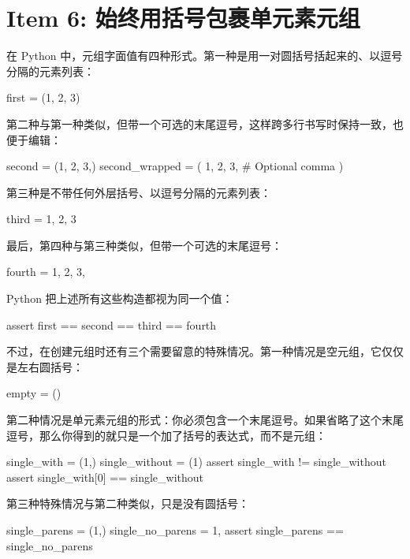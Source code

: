 \section{Item 6: 始终用括号包裹单元素元组}

在 Python 中，元组字面值有四种形式。第一种是用一对圆括号括起来的、以逗号分隔的元素列表：

\begin{codebox}[python]
first = (1, 2, 3)
\end{codebox}

第二种与第一种类似，但带一个可选的末尾逗号，这样跨多行书写时保持一致，也便于编辑：

\begin{codebox}[python]
second = (1, 2, 3,)
second_wrapped = (
    1,
    2,
    3,  # Optional comma
)
\end{codebox}

第三种是不带任何外层括号、以逗号分隔的元素列表：

\begin{codebox}[python]
third = 1, 2, 3
\end{codebox}

最后，第四种与第三种类似，但带一个可选的末尾逗号：

\begin{codebox}[python]
fourth = 1, 2, 3,
\end{codebox}

Python 把上述所有这些构造都视为同一个值：

\begin{codebox}[python]
assert first == second == third == fourth
\end{codebox}

不过，在创建元组时还有三个需要留意的特殊情况。第一种情况是空元组，它仅仅是左右圆括号：

\begin{codebox}[python]
empty = ()
\end{codebox}

第二种情况是单元素元组的形式：你必须包含一个末尾逗号。如果省略了这个末尾逗号，那么你得到的就只是一个加了括号的表达式，而不是元组：

\begin{codebox}[python]
single_with = (1,)
single_without = (1)
assert single_with != single_without
assert single_with[0] == single_without
\end{codebox}

第三种特殊情况与第二种类似，只是没有圆括号：

\begin{codebox}[python]
single_parens = (1,)
single_no_parens = 1,
assert single_parens == single_no_parens
\end{codebox}

